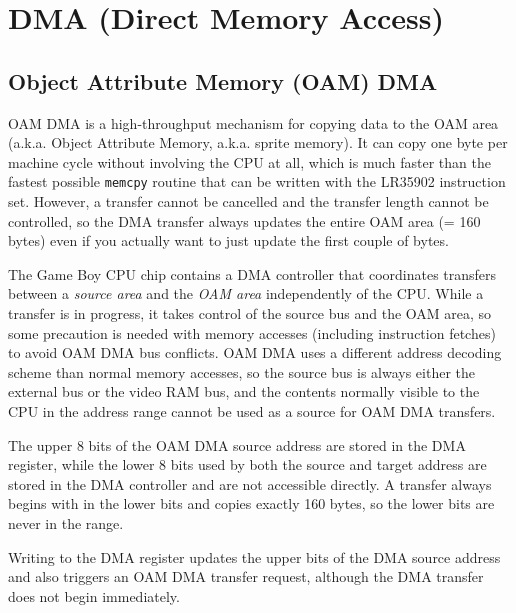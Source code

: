 \chapter{DMA (Direct Memory Access)}

\section{Object Attribute Memory (OAM) DMA}

OAM DMA is a high-throughput mechanism for copying data to the OAM area (a.k.a.
Object Attribute Memory, a.k.a. sprite memory). It can copy one byte per
machine cycle without involving the CPU at all, which is much faster than the
fastest possible \texttt{memcpy} routine that can be written with the LR35902
instruction set. However, a transfer cannot be cancelled and the transfer
length cannot be controlled, so the DMA transfer always updates the entire OAM
area (= 160 bytes) even if you actually want to just update the first couple of
bytes.

The Game Boy CPU chip contains a DMA controller that coordinates transfers
between a \emph{source area} and the \emph{OAM area} independently of the CPU.
While a transfer is in progress, it takes control of the source bus and the OAM
area, so some precaution is needed with memory accesses (including instruction
fetches) to avoid OAM DMA bus conflicts. OAM DMA uses a different address
decoding scheme than normal memory accesses, so the source bus is always either
the external bus or the video RAM bus, and the contents normally visible to the
CPU in the  address range cannot be used as a source for
OAM DMA transfers.

The upper 8 bits of the OAM DMA source address are stored in the DMA register,
while the lower 8 bits used by both the source and target address are stored in
the DMA controller and are not accessible directly. A transfer always begins
with  in the lower bits and copies exactly 160 bytes, so the lower bits
are never in the  range.

Writing to the DMA register updates the upper bits of the DMA source address
and also triggers an OAM DMA transfer request, although the DMA transfer does
not begin immediately.

